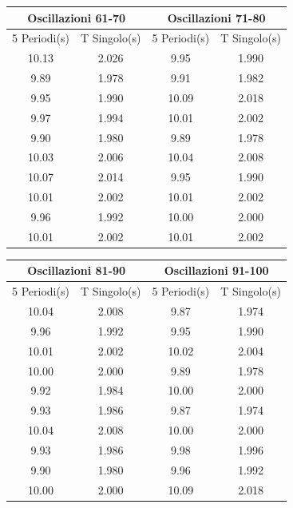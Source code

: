 \documentclass[a4paper]{article}
\begin{document}
\begin{center}
    \begin{tabular}{|c|c||c|c|}
    \hline
    \multicolumn{2}{|c||}{Oscillazioni 61-70} & \multicolumn{2}{|c|}{Oscillazioni 71-80} \\
    \hline
    5 Periodi(s) & T Singolo(s) & 5 Periodi(s) & T Singolo(s) \\
    \hline
      10.13 & 2.026 &  9.95 & 1.990 \\
       9.89 & 1.978 &  9.91 & 1.982 \\
       9.95 & 1.990 & 10.09 & 2.018 \\
       9.97 & 1.994 & 10.01 & 2.002 \\
       9.90 & 1.980 &  9.89 & 1.978 \\
      10.03 & 2.006 & 10.04 & 2.008 \\
      10.07 & 2.014 &  9.95 & 1.990 \\ 
      10.01 & 2.002 & 10.01 & 2.002 \\
       9.96 & 1.992 & 10.00 & 2.000 \\
      10.01 & 2.002 & 10.01 & 2.002 \\
    \hline
    \end{tabular}
\end{center}

\begin{center}
    \begin{tabular}{|c|c||c|c|}
    \hline
    \multicolumn{2}{|c||}{Oscillazioni 81-90} & \multicolumn{2}{|c|}{Oscillazioni 91-100} \\
    \hline
    5 Periodi(s) & T Singolo(s) & 5 Periodi(s) & T Singolo(s) \\
    \hline
      10.04 & 2.008 &  9.87 & 1.974 \\
       9.96 & 1.992 &  9.95 & 1.990 \\
      10.01 & 2.002 & 10.02 & 2.004 \\
      10.00 & 2.000 &  9.89 & 1.978 \\
       9.92 & 1.984 & 10.00 & 2.000 \\
       9.93 & 1.986 &  9.87 & 1.974 \\
      10.04 & 2.008 & 10.00 & 2.000 \\ 
       9.93 & 1.986 &  9.98 & 1.996 \\
       9.90 & 1.980 &  9.96 & 1.992 \\
      10.00 & 2.000 & 10.09 & 2.018 \\
    \hline
    \end{tabular}
\end{center}
\end{document}
